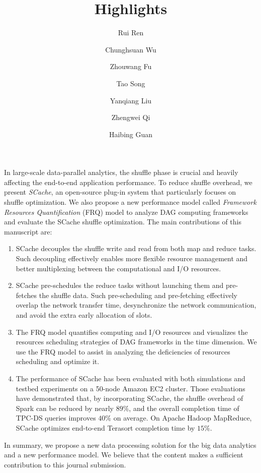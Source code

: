 \documentclass[12pt,reqno]{amsart}
\title{Highlights}
\author{Rui Ren}
\author{Chunghsuan Wu}
\author{Zhouwang Fu}
\author{Tao Song}
\author{Yanqiang Liu}
\author{Zhengwei Qi}
\author{Haibing Guan}
\theoremstyle{plain}
\numberwithin{equation}{section}
\theoremstyle{plain}
\numberwithin{equation}{section}
\begin{document}
\maketitle


In large-scale data-parallel analytics, the shuffle phase is crucial and heavily affecting the end-to-end application performance.
To reduce shuffle overhead, we present \textit{SCache}, an open-source plug-in system that particularly focuses on shuffle optimization.
We also propose a new performance model called \textit{Framework Resources Quantification} (FRQ) model to analyze DAG computing frameworks and evaluate the SCache shuffle optimization. 
The main contributions of this manuscript are:
\begin{enumerate}
    \item 
    SCache decouples the shuffle write and read from both map and reduce tasks.
    Such decoupling effectively enables more flexible resource management and better multiplexing between the computational and I/O resources.
    \item
    SCache pre-schedules the reduce tasks without launching them and pre-fetches the shuffle data. 
    Such pre-scheduling and pre-fetching effectively overlap the network transfer time, desynchronize the network communication, 
    and avoid the extra early allocation of slots.
    \item
    The FRQ model quantifies computing and I/O resources and visualizes the resources scheduling strategies of DAG frameworks in the time dimension.
    We use the FRQ model to assist in analyzing the deficiencies of resources scheduling and optimize it. 
    \item
    The performance of SCache has been evaluated with both simulations and testbed experiments on a 50-node Amazon EC2 cluster.
    Those evaluations have demonstrated that, by incorporating SCache, the shuffle overhead of Spark can be reduced by nearly $89\%$, and the overall completion time of TPC-DS queries improves $40\%$ on average. On Apache Hadoop MapReduce, SCache optimizes end-to-end Terasort completion time by $15\%$.
\end{enumerate}

In summary, we propose a new data processing solution for the big data analytics and a new performance model.
We believe that the content makes a sufficient contribution to this journal submission.



% 
% 
\end{document}
